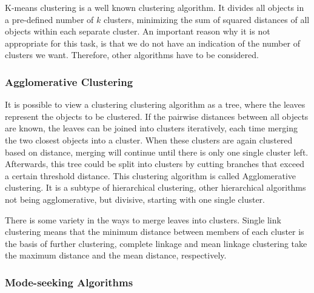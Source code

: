 K-means clustering is a well known clustering algorithm. It divides all objects in a pre-defined number of $k$ clusters, minimizing the sum of squared distances of all objects within each separate cluster. An important reason why it is not appropriate for this task, is that we do not have an indication of the number of clusters we want. Therefore, other algorithms have to be considered.

\begin{figure}[hbt]
    \label{fig:sl_vs_qs_clustering}
    \centering
\end{figure}


\subsubsection{Agglomerative Clustering} %
\label{sub:agglomerative_clustering}
It is possible to view a clustering clustering algorithm as a tree, where the leaves represent the objects to be clustered. If the pairwise distances between all objects are known, the leaves can be joined into clusters iteratively, each time merging the two closest objects into a cluster. When these clusters are again clustered based on distance, merging will continue until there is only one single cluster left. Afterwards, this tree could be split into clusters by cutting branches that exceed a certain threshold distance. This clustering algorithm is called Agglomerative clustering. It is a subtype of hierarchical clustering, other hierarchical algorithms not being agglomerative, but divisive, starting with one single cluster.

There is some variety in the ways to merge leaves into clusters. Single link clustering means that the minimum distance between members of each cluster is the basis of further clustering, complete linkage and mean linkage clustering take the maximum distance and the mean distance, respectively.



\subsubsection{Mode-seeking Algorithms} %
\label{sub:mode_finding_algorithms}


